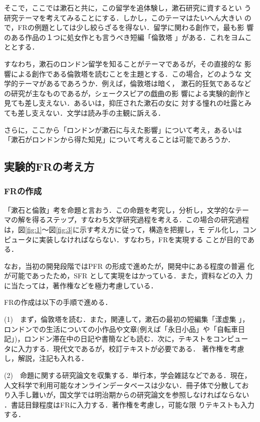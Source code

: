 そこで，ここでは漱石と共に，この留学を追体験し，漱石研究に資するとい
う研究テーマを考えてみることにする．しかし，このテーマはたいへん大きい
ので，FRの例題としては少し絞らざるを得ない．留学に関わる創作で，最も影
響のある作品の１つに処女作とも言うべき短編「倫敦塔
\setcounter{footnote}{0}\footnotemark 」がある．これをヨムこととする．

すなわち，漱石のロンドン留学を知ることがテーマであるが，その直接的な
影響による創作である倫敦塔を読むことを主題とする．この場合，どのような
文学的テーマがあるであろうか\cite{Mizutani1987}．例えば，倫敦塔は暗く，
漱石的狂気であるなどの研究が主なものであるが，シェークスピアの戯曲の影
響による実験的創作と見ても差し支えない．あるいは，抑圧された漱石の女に
対する憧れの吐露とみても差し支えない．文学は読み手の主観に訴える．

さらに，ここから「ロンドンが漱石に与えた影響」について考え，あるいは
「漱石がロンドンから得た知見」について考えることは可能であろうか．

\subsection{実験的FRの考え方}

\subsubsection{FRの作成}
「漱石と倫敦」考を命題と言おう．この命題を考究し，分析し，文学的なテー
マの解を得るステップ，すなわち文学研究過程を考える．この場合の研究過程
は，図\ref{fig:1}〜図\ref{fig:3}に示す考え方に従って，構造を把握し，モ
デル化し，コンピュータに実装しなければならない．すなわち，FRを実現する
ことが目的である．

なお，当初の開発段階ではPFR の形成で進めたが，開発中にある程度の普遍
化が可能であったため，SFR として実現をはかっている．また，資料などの入
力に当たっては，著作権などを極力考慮している．

FRの作成は以下の手順で進める．

(1)\ \ まず，倫敦塔を読む．また，関連して，漱石の最初の短編集「漾虚集
\setcounter{footnote}{0}\footnotemark 」，
ロンドンでの生活についての小作品や文章(例えば「永日小品」や「自転車日
記」)，ロンドン滞在中の日記や書簡なども読む．次に，テキストをコンピュー
タに入力する．現代文であるが，校訂テキストが必要である\cite{Etou1991}．
著作権を考慮し，解説，注記も入れる．

(2)\ \ 命題に関する研究論文を収集する．単行本，学会雑誌などである．現在，
人文科学で利用可能なオンラインデータベースは少ない．冊子体で分散してお
り入手し難いが，国文学では明治期からの研究論文を参照しなければならない
\cite{Sawai1993}．書誌目録程度はFRに入力する．著作権を考慮し，可能な限
りテキストも入力する．

